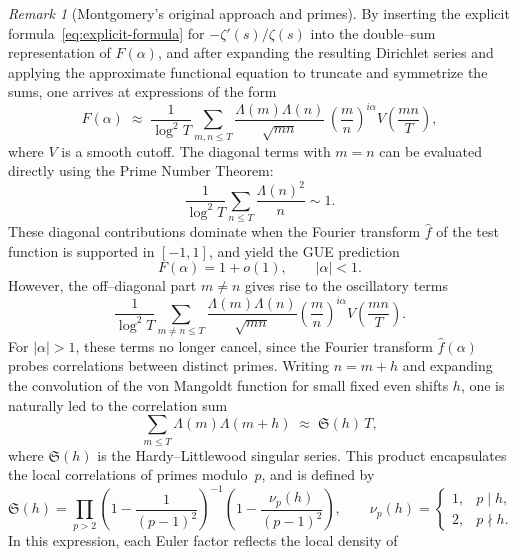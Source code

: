 \documentclass[12pt,reqno]{amsart}
\theoremstyle{plain}
\theoremstyle{definition}
\theoremstyle{remark}
\newtheorem{rem}{Remark}[section]       %
\begin{document}
\begin{rem}[Montgomery's original approach and primes]
By inserting the explicit formula~\eqref{eq:explicit-formula} for 
\(-\zeta'(s)/\zeta(s)\) into the double–sum representation 
of \(F(\alpha)\), and after expanding the resulting Dirichlet series 
and applying the approximate functional equation to truncate and 
symmetrize the sums, one arrives at expressions of the form
\begin{equation}\label{eq:explicit-pairs}
F(\alpha)
\;\approx\;
\frac{1}{\log^2 T}
\sum_{m,n\le T}\frac{\Lambda(m)\Lambda(n)}{\sqrt{mn}}\,
\left(\frac{m}{n}\right)^{i\alpha}
V\!\left(\frac{mn}{T}\right),
\end{equation}
where $V$ is a smooth cutoff.
The diagonal terms with $m=n$ can be evaluated directly using the Prime Number Theorem:
\[
\frac{1}{\log^2 T}
\sum_{n\le T}\frac{\Lambda(n)^2}{n}
\sim 1.
\]
These diagonal contributions dominate when the Fourier transform
$\widehat{f}$ of the test function is supported in $[-1,1]$,
and yield the GUE prediction
\begin{equation}
F(\alpha)=1+o(1),
\qquad |\alpha|<1.
\end{equation}
However, the off--diagonal part $m\ne n$ gives rise to the oscillatory terms
\begin{equation}\label{eq:off-diag}
\frac{1}{\log^2 T}\!
\sum_{m\ne n\le T}\!\frac{\Lambda(m)\Lambda(n)}{\sqrt{mn}}
\!\left(\frac{m}{n}\right)^{i\alpha}
V\!\left(\frac{mn}{T}\right).
\end{equation}
For $|\alpha|>1$, these terms no longer cancel,
since the Fourier transform $\widehat{f}(\alpha)$
probes correlations between distinct primes.
Writing $n = m + h$ and expanding the convolution of the von Mangoldt function
for small fixed even shifts $h$, one is naturally led to the correlation sum
\begin{equation}\label{eq:HL-structure}
\sum_{m\le T}\Lambda(m)\Lambda(m+h)
\;\approx\;
\mathfrak{S}(h)\,T,
\end{equation}
where $\mathfrak{S}(h)$ is the Hardy--Littlewood singular series.
This product encapsulates the local correlations of primes modulo~$p$,
and is defined by
\begin{equation}\label{eq:HL-singular-series}
\mathfrak{S}(h)
= \prod_{p>2}
\left(1 - \frac{1}{(p-1)^2}\right)^{-1}
\left(1 - \frac{\nu_p(h)}{(p-1)^2}\right),
\qquad
\nu_p(h)
=
\begin{cases}
1, & p\mid h,\\[4pt]
2, & p\nmid h.
\end{cases}
\end{equation}
In this expression, each Euler factor reflects the local density of

\end{rem}
\end{document}
